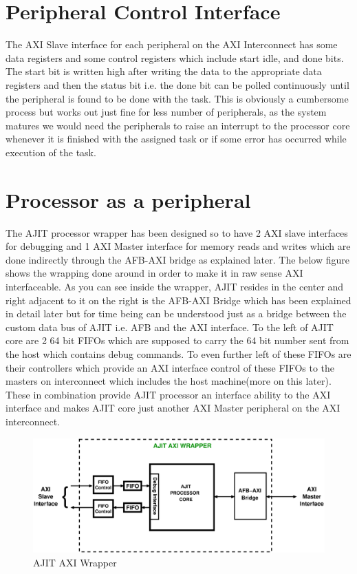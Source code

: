 \section{Peripheral Control Interface}

The AXI Slave interface for each peripheral on the AXI Interconnect has some data registers and some control registers which include start
idle, and done bits. The start bit is written high after writing the data to the appropriate data registers and then the status bit i.e. the
done bit can be polled continuously until the peripheral is found to be done with the task. This is obviously a cumbersome process but works
out just fine for less number of peripherals, as the system matures we would need the peripherals to raise an interrupt to the processor
core whenever it is finished with the assigned task or if some error has occurred while execution of the task. 

\section{Processor as a peripheral} 

The AJIT processor wrapper has been designed so to have 2 AXI slave interfaces for debugging and 1 AXI Master interface for memory reads and writes
which are done indirectly through the AFB-AXI bridge as explained later. The below figure shows the wrapping done around in order to make it
in raw sense AXI interfaceable. As you can see inside the wrapper, AJIT resides in the center and right adjacent to it on the right is the
AFB-AXI Bridge which has been explained in detail later but for time being can be understood just as a bridge between the custom data bus of
AJIT i.e. AFB and the AXI interface. To the left of AJIT core are 2 64 bit FIFOs which are supposed to carry the 64 bit number sent from the
host which contains debug commands. To even further left of these FIFOs are their controllers which provide an AXI interface control of
these FIFOs to the masters on interconnect which includes the host machine(more on this later). These in combination provide AJIT
processor an interface ability to the AXI interface and makes AJIT core just another AXI Master peripheral on the AXI interconnect.\\

\begin{figure}[H]
\centering
\includegraphics[scale=0.6]{eps_pdf_sources/ajit_fpga/System_Level/ajit_combined}
\caption{AJIT AXI Wrapper}
\label{ajit_combined}
\end{figure}

